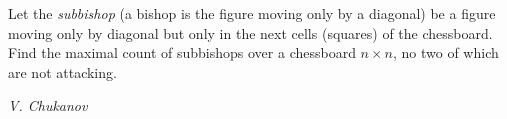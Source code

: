 Let the \textit{subbishop} (a bishop is the figure moving only by a diagonal) be a figure moving only by diagonal but only in the next cells (squares) of the chessboard. Find the maximal count of subbishops over a chessboard $n\times n$, no two of which are not attacking.

\textit{V. Chukanov}